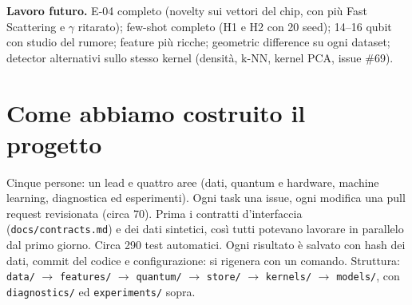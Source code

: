 \textbf{Lavoro futuro.} E-04 completo (novelty sui vettori del chip, con più Fast Scattering e $\gamma$ ritarato);
few-shot completo (H1 e H2 con 20 seed); 14--16 qubit con studio del rumore; feature più ricche; geometric difference
su ogni dataset; detector alternativi sullo stesso kernel (densità, k-NN, kernel PCA, issue \#69).

\section{Come abbiamo costruito il progetto}
Cinque persone: un lead e quattro aree (dati, quantum e hardware, machine learning, diagnostica ed esperimenti). Ogni
task una issue, ogni modifica una pull request revisionata (circa 70). Prima i contratti d’interfaccia
(\texttt{docs/contracts.md}) e dei dati sintetici, così tutti potevano lavorare in parallelo dal primo giorno. Circa 290
test automatici. Ogni risultato è salvato con hash dei dati, commit del codice e configurazione: si rigenera con un
comando. Struttura: \texttt{data/} $\to$ \texttt{features/} $\to$ \texttt{quantum/} $\to$ \texttt{store/} $\to$
\texttt{kernels/} $\to$ \texttt{models/}, con \texttt{diagnostics/} ed \texttt{experiments/} sopra.
